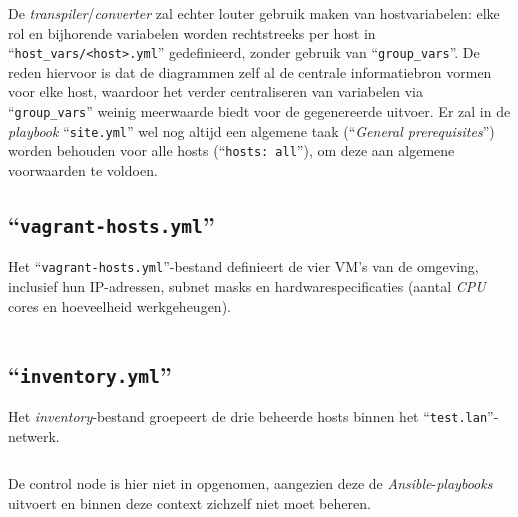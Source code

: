 De \emph{transpiler}/\emph{converter} zal echter louter gebruik maken van hostvariabelen: elke rol en bijhorende variabelen worden rechtstreeks per host in \\``\texttt{host\_vars/<host>.yml}'' gedefinieerd, zonder gebruik van ``\texttt{group\_vars}''. De reden hiervoor is dat de diagrammen zelf al de centrale informatiebron vormen voor elke host, waardoor het verder centraliseren van variabelen via ``\texttt{group\_vars}'' weinig meerwaarde biedt voor de gegenereerde uitvoer. Er zal in de \emph{playbook} ``\texttt{site.yml}'' wel nog altijd een algemene taak (``\emph{General prerequisites}'') worden behouden voor alle hosts (``\texttt{hosts: all}''), om deze aan algemene voorwaarden te voldoen.

\subsection{``\texttt{vagrant-hosts.yml}''}%

Het ``\texttt{vagrant-hosts.yml}''-bestand definieert de vier VM's van de omgeving, inclusief hun IP-adressen, subnet masks en hardwarespecificaties (aantal \emph{CPU} cores en hoeveelheid werkgeheugen).

\begin{codeblock}
    \inputminted{yaml}{../project_files/manual_test_env/vagrant-hosts.yml}
    \caption[``\texttt{vagrant-hosts.yml}'' van de manuele testomgeving]{``\texttt{vagrant-hosts.yml}'' van de manuele testomgeving; definieert de vier VM's met hun IP-adressen en hardwarespecificaties.}
    \label{code:vagrant-hosts.yml}
\end{codeblock}

\subsection{``\texttt{inventory.yml}''}%

Het \emph{inventory}-bestand groepeert de drie beheerde hosts binnen het ``\texttt{test.lan}''-netwerk.

\begin{codeblock}
    \inputminted{yaml}{../project_files/manual_test_env/ansible/inventory.yml}
    \caption[``\texttt{inventory.yml}'' van de manuele testomgeving]{``\texttt{inventory.yml}'' van de manuele testomgeving; groepeert de drie beheerde hosts onder ``\texttt{test.lan}''.}
    \label{code:inventory.yml}
\end{codeblock}

De control node is hier niet in opgenomen, aangezien deze de \emph{Ansible}-\emph{playbooks} uitvoert en binnen deze context zichzelf niet moet beheren.


